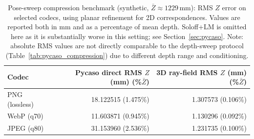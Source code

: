 \begin{table}[H]
\centering
\scriptsize
\setlength{\tabcolsep}{4pt}
\begin{tabular}{lrr}
\toprule
Codec & \shortstack{Pycaso direct\\RMS $Z$ (mm)\\(\%$\bar Z$)} & \shortstack{3D ray-field\\RMS $Z$ (mm)\\(\%$\bar Z$)} \\
\midrule
PNG (lossless) & 18.122515 (1.475\%) & 1.307573 (0.106\%) \\
WebP (q70) & 11.603871 (0.945\%) & 1.130296 (0.092\%) \\
JPEG (q80) & 31.153960 (2.536\%) & 1.231735 (0.100\%) \\
\bottomrule
\end{tabular}
\caption{Pose-sweep compression benchmark (synthetic, $\bar Z\approx 1229$\,mm): RMS $Z$ error on selected codecs, using planar refinement for 2D correspondences. Values are reported both in mm and as a percentage of mean depth. Soloff+LM is omitted here as it is substantially worse in this setting; see Section~\ref{sec:pycaso}. Note: absolute RMS values are not directly comparable to the depth-sweep protocol (Table~\ref{tab:pycaso_compression}) due to different depth range and conditioning.}
\label{tab:pycaso_pose_sweep}
\end{table}

